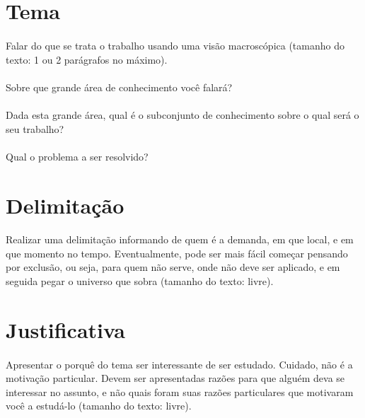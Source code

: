 \section{Tema}

\paragraph{}Falar do que se trata o trabalho usando uma visão macroscópica (tamanho do texto: 1 ou 2 parágrafos no máximo).

\paragraph{}Sobre que grande área de conhecimento você falará?

\paragraph{}Dada esta grande área, qual é o subconjunto de conhecimento sobre o qual será o seu trabalho?

\paragraph{}Qual o problema a ser resolvido?


\section{Delimitação}

\paragraph{}Realizar uma delimitação informando de quem é a demanda, em que local, e em que momento no tempo. Eventualmente, pode ser mais fácil começar pensando por exclusão, ou seja, para quem não serve, onde não deve ser aplicado, e em seguida pegar o universo que sobra (tamanho do texto: livre).


\section{Justificativa}

\paragraph{}Apresentar o porquê do tema ser interessante de ser estudado. Cuidado, não é a motivação particular. Devem ser apresentadas razões para que alguém deva se interessar no assunto, e não quais foram suas razões particulares que motivaram você a estudá-lo (tamanho do texto: livre).



